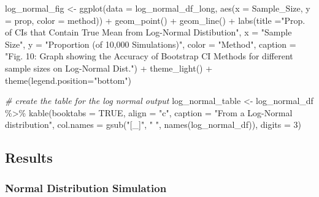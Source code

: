 \documentclass[12pt]{article}
\newenvironment{Shaded}{\begin{snugshade}}{\end{snugshade}}
\newcommand{\AttributeTok}[1]{\textcolor[rgb]{0.77,0.63,0.00}{#1}}
\newcommand{\CommentTok}[1]{\textcolor[rgb]{0.56,0.35,0.01}{\textit{#1}}}
\newcommand{\ConstantTok}[1]{\textcolor[rgb]{0.00,0.00,0.00}{#1}}
\newcommand{\DecValTok}[1]{\textcolor[rgb]{0.00,0.00,0.81}{#1}}
\newcommand{\FunctionTok}[1]{\textcolor[rgb]{0.00,0.00,0.00}{#1}}
\newcommand{\NormalTok}[1]{#1}
\newcommand{\OtherTok}[1]{\textcolor[rgb]{0.56,0.35,0.01}{#1}}
\newcommand{\SpecialCharTok}[1]{\textcolor[rgb]{0.00,0.00,0.00}{#1}}
\newcommand{\StringTok}[1]{\textcolor[rgb]{0.31,0.60,0.02}{#1}}
\begin{document}
\begin{Shaded}
\begin{Highlighting}[]
\NormalTok{log\_normal\_fig }\OtherTok{\textless{}{-}} \FunctionTok{ggplot}\NormalTok{(}\AttributeTok{data =}\NormalTok{ log\_normal\_df\_long, }
                    \FunctionTok{aes}\NormalTok{(}\AttributeTok{x =}\NormalTok{ Sample\_Size, }\AttributeTok{y =}\NormalTok{ prop, }\AttributeTok{color =}\NormalTok{ method)) }\SpecialCharTok{+} 
  \FunctionTok{geom\_point}\NormalTok{() }\SpecialCharTok{+} \FunctionTok{geom\_line}\NormalTok{() }\SpecialCharTok{+} 
  \FunctionTok{labs}\NormalTok{(}\AttributeTok{title =}\StringTok{"Prop. of CIs that Contain True Mean from Log{-}Normal Distibution"}\NormalTok{,}
       \AttributeTok{x =} \StringTok{"Sample Size"}\NormalTok{, }
       \AttributeTok{y =} \StringTok{"Proportion (of 10,000 Simulations)"}\NormalTok{, }\AttributeTok{color =} \StringTok{"Method"}\NormalTok{,}
       \AttributeTok{caption =} \StringTok{"Fig. 10: Graph showing the Accuracy of Bootstrap CI Methods }
\StringTok{       for different sample sizes on Log{-}Normal Dist."}\NormalTok{) }\SpecialCharTok{+}
  \FunctionTok{theme\_light}\NormalTok{() }\SpecialCharTok{+}
  \FunctionTok{theme}\NormalTok{(}\AttributeTok{legend.position=}\StringTok{"bottom"}\NormalTok{)}

\CommentTok{\# create the table for the log normal output}
\NormalTok{log\_normal\_table }\OtherTok{\textless{}{-}}\NormalTok{ log\_normal\_df }\SpecialCharTok{\%\textgreater{}\%}
  \FunctionTok{kable}\NormalTok{(}\AttributeTok{booktabs =} \ConstantTok{TRUE}\NormalTok{, }\AttributeTok{align =} \StringTok{"c"}\NormalTok{, }
        \AttributeTok{caption =} \StringTok{"From a Log{-}Normal distribution"}\NormalTok{, }
        \AttributeTok{col.names =} \FunctionTok{gsub}\NormalTok{(}\StringTok{"[\_]"}\NormalTok{, }\StringTok{" "}\NormalTok{, }\FunctionTok{names}\NormalTok{(log\_normal\_df)), }\AttributeTok{digits =} \DecValTok{3}\NormalTok{)}
\end{Highlighting}
\end{Shaded}

\hypertarget{results}{%
\subsection{Results}\label{results}}

\hypertarget{normal-distribution-simulation}{%
\subsubsection{Normal Distribution
Simulation}\label{normal-distribution-simulation}}
\end{document}
